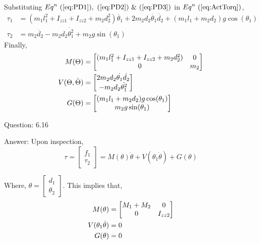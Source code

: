 \documentclass[a4paper]{article}
\begin{document}
\begin{qalist}
			Substituting  ${Eq}^{n}~(\ref{eq:PD1}),~(\ref{eq:PD2})~\&~(\ref{eq:PD3})$ in   ${Eq}^{n}~(\ref{eq:ActTorq})$, 
			\begin{align}
				\label{eq:Torq1} {\tau}_{1} &= ({m}_{1} {l}^{2}_{1} + {I}_{zz1} + {I}_{zz2} + {m}_{2}{d}^{2}_{2})\ddot{{\theta}_{1}} + 2{m}_{2} {d}_{2}\dot{{\theta}_{1}}\dot{{d}_{2}} + ({m}_{1} {l}_{1} + {m}_{2} {d}_{2} )g \cos({\theta}_{1}) \\ 
				\label{eq:Torq2} {\tau}_{2} &= {m}_{2}\ddot{{d}_{2}} - {m}_{2} {d}_{2} \dot{{\theta}^{2}_{1}} + {m}_{2} g \sin({\theta}_{1})
			\end{align}
			Finally, 
			\begin{align}
				\notag M(\Theta) &= \begin{bmatrix} ({m}_{1} {l}^{2}_{1} + {I}_{zz1} + {I}_{zz2} + {m}_{2}{d}^{2}_{2})  & 0 \\ 0 & {m}_{2}\end{bmatrix} \\ 
				\label{eq:FIN} V (\Theta, \dot{\Theta}) &= \begin{bmatrix} 2{m}_{2}{d}_{2} \dot{{\theta}_{1}}\dot{{d}_{2}} \\ -{m}_{2}{d}_{2}\dot{{\theta}^{2}_{1}}\end{bmatrix} \\ 
				\notag G(\Theta) &= \begin{bmatrix} ({m}_{1} {l}_{1} + {m}_{2}{d}_{2}) g \cos({\theta}_{1}) \\ {m}_{2}g\sin({\theta}_{1})\end{bmatrix}
			\end{align}
		\item[Question: 6.16] \setcounter{equation}{0} %
		\item[Answer:] Upon inspection, 
			\begin{equation}
				\tau = \begin{bmatrix} {f}_{1} \\ {\tau}_{2} \end{bmatrix} = M(\theta) \ddot{\theta} + V({\theta}_{1}\dot{\theta}) + G(\theta)
			\end{equation}
			
			Where, $\theta = \begin{bmatrix} {d}_{1} \\ {\theta}_{2}\end{bmatrix}$. This implies that, 
			\begin{align}
				M(\theta) &= \begin{bmatrix} {M}_{1} + {M}_{2}  & 0 \\ 0 & {I}_{zz2} \end{bmatrix} \notag \\
				V({\theta}_{1} \dot{\theta}) &= 0 \notag \\
				G(\theta) &= 0 \notag
			\end{align}
		

\end{qalist}
\end{document}
